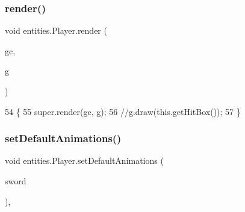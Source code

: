 \subsubsection{\texorpdfstring{render()}{render()}}
{\footnotesize\ttfamily void entities.\+Player.\+render (\begin{DoxyParamCaption}\item[{\mbox{\hyperlink{classorg_1_1newdawn_1_1slick_1_1_game_container}{Game\+Container}}}]{gc,  }\item[{\mbox{\hyperlink{classorg_1_1newdawn_1_1slick_1_1_graphics}{Graphics}}}]{g }\end{DoxyParamCaption})\hspace{0.3cm}{\ttfamily [inline]}}


\begin{DoxyCode}
54                                                      \{
55         super.render(gc, g);
56         \textcolor{comment}{//g.draw(this.getHitBox());}
57     \}
\end{DoxyCode}
\mbox{\label{classentities_1_1_player_ad14066cb09a88306ecedb44f7f9f9e60}} 
\subsubsection{\texorpdfstring{set\+Default\+Animations()}{setDefaultAnimations()}}
{\footnotesize\ttfamily void entities.\+Player.\+set\+Default\+Animations (\begin{DoxyParamCaption}\item[{boolean}]{sword }\end{DoxyParamCaption})\hspace{0.3cm}{\ttfamily [inline]}, {\ttfamily [private]}}



